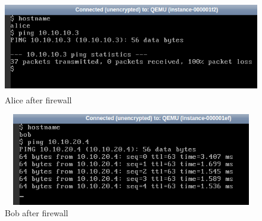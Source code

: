    \begin{figure}[h]
            \centering
            \includegraphics[width=14cm,height=4cm]{images/alice_after.png}
            \caption{Alice after firewall}
    \end{figure}
    \begin{figure}[h]
            \centering
            \includegraphics[width=14cm,height=4cm]{images/bob_after.png}
            \caption{Bob after firewall}
    \end{figure}    
    
    \clearpage
